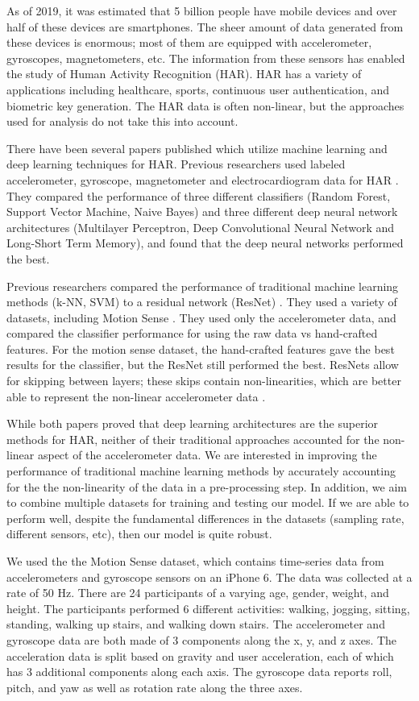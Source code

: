 As of 2019, it was estimated that 5 billion people have mobile devices and over half of these devices are smartphones. The sheer amount of data generated from these devices is enormous; most of them are equipped with accelerometer, gyroscopes, magnetometers, etc. The information from these sensors has enabled  the study of Human Activity Recognition (HAR). HAR has a variety of applications including healthcare, sports, continuous user authentication, and biometric key generation. The HAR data is often non-linear, but the approaches used for analysis do not take this into account.

There have been several papers published which utilize machine learning and deep learning techniques for HAR. Previous researchers used labeled accelerometer, gyroscope, magnetometer and electrocardiogram data for HAR \cite{masum2019human}. They compared the performance of three different classifiers (Random Forest, Support Vector Machine, Naive Bayes) and three different deep neural network architectures (Multilayer Perceptron, Deep Convolutional Neural Network and Long-Short Term Memory), and found that the deep neural networks performed the best. 

Previous researchers compared the performance of traditional machine learning methods (k-NN, SVM) to a residual network (ResNet) \cite{ferrari2019hand}. They used a variety of datasets, including Motion Sense \cite{malekzadeh2018protecting}. They used only the accelerometer data, and compared the classifier performance for using the raw data vs hand-crafted features. For the motion sense dataset, the hand-crafted features gave the best results for the classifier, but the ResNet still performed the best. ResNets allow for skipping between layers; these skips contain non-linearities, which are better able to represent the non-linear accelerometer data \cite{he2016deep}.

While both papers proved that deep learning architectures are the superior methods for HAR, neither of their traditional approaches accounted for the non-linear aspect of the accelerometer data. We are interested in improving the performance of traditional machine learning methods by accurately accounting for the the non-linearity of the data in a pre-processing step. In addition, we aim to combine multiple datasets for training and testing our model. If we are able to perform well, despite the fundamental differences in the datasets (sampling rate, different sensors, etc), then our model is quite robust.

We used the the Motion Sense dataset, which contains time-series data from accelerometers and gyroscope sensors on an iPhone 6. The data was collected at a rate of 50 Hz. There are 24 participants of a varying age, gender, weight, and height. The participants performed 6 different activities: walking, jogging, sitting, standing, walking up stairs, and walking down stairs. The accelerometer and gyroscope data are both made of 3 components along the x, y, and z axes. The acceleration data is split based on gravity and user acceleration, each of which has 3 additional components along each axis. The gyroscope data reports roll, pitch, and yaw as well as rotation rate along the three axes.

